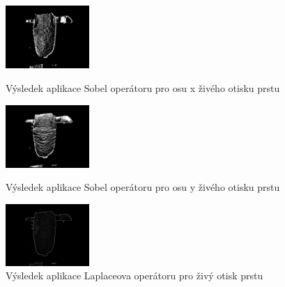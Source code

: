 \begin{figure}[!htbp]
  \begin{minipage}[b]{0.3\linewidth}
    \centering
    \includegraphics[width=120px]{obrazky-figures/sobelxlive.png}
    \caption{Výsledek aplikace Sobel operátoru pro osu x živého otisku prstu}
  \end{minipage}
  \hspace{0.3cm}
  \begin{minipage}[b]{0.3\linewidth}
    \centering
    \includegraphics[width=120px]{obrazky-figures/sobelylive.png}
    \caption{Výsledek aplikace Sobel operátoru pro osu y živého otisku prstu}
  \end{minipage}
  \hspace{0.3cm}
    \begin{minipage}[b]{0.3\linewidth}
    \centering
    \includegraphics[width=120px]{obrazky-figures/laplacianlive.png}
    \caption{Výsledek aplikace Laplaceova operátoru pro živý otisk prstu}
  \end{minipage}
\end{figure}

